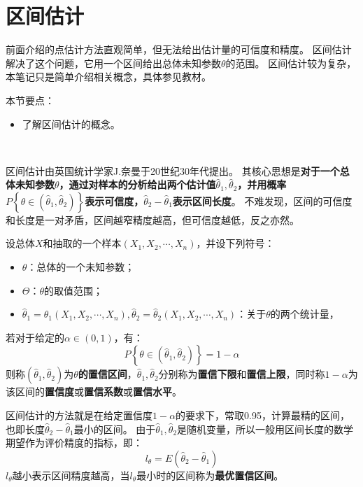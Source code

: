 \section{区间估计}

前面介绍的点估计方法直观简单，但无法给出估计量的可信度和精度。
区间估计解决了这个问题，它用一个区间给出总体未知参数$\theta $的范围。
区间估计较为复杂，本笔记只是简单介绍相关概念，具体参见教材。

本节要点：
\begin{itemize}
    \item 了解区间估计的概念。
\end{itemize}

~

区间估计由英国统计学家J.奈曼于20世纪30年代提出。
其核心思想是{\bf 对于一个总体未知参数$\theta $，通过对样本的分析给出两个估计值$\hat{\theta}_1,\hat{\theta}_2$，并用概率$P\left\{ \theta \in \left( \hat{\theta}_1,\hat{\theta}_2 \right) \right\} $表示可信度，$\hat{\theta}_2-\hat{\theta}_1$表示区间长度}。
不难发现，区间的可信度和长度是一对矛盾，区间越窄精度越高，但可信度越低，反之亦然。

\begin{definition}[区间估计]
设总体$X$和抽取的一个样本$\left( X_1,X_2,\cdots ,X_n \right) $，并设下列符号：
\begin{itemize}
    \item $\theta $：总体的一个未知参数；
    \item $\varTheta $：$\theta $的取值范围；
    \item $\hat{\theta}_1=\hat{\theta}_1\left( X_1,X_2,\cdots ,X_n \right) ,\hat{\theta}_2=\hat{\theta}_2\left( X_1,X_2,\cdots ,X_n \right) $：关于$\theta $的两个统计量，
\end{itemize}
若对于给定的$\alpha \in \left( 0,1 \right) $，有：
\[
P\left\{ \theta \in \left( \hat{\theta}_1,\hat{\theta}_2 \right) \right\} =1-\alpha
\]
则称$\left( \hat{\theta}_1,\hat{\theta}_2 \right) $为{\bf $\theta $的置信区间}，$\hat{\theta}_1,\hat{\theta}_2$分别称为{\bf 置信下限}和{\bf 置信上限}，同时称$1-\alpha$为该区间的{\bf 置信度}或{\bf 置信系数}或{\bf 置信水平}。
\end{definition}

区间估计的方法就是在给定置信度$1-\alpha$的要求下，常取0.95，计算最精的区间，也即长度$\hat{\theta}_2-\hat{\theta}_1$最小的区间。
由于$\hat{\theta}_1,\hat{\theta}_2$是随机变量，所以一般用区间长度的数学期望作为评价精度的指标，即：
\[
l_{\theta}=E\left( \hat{\theta}_2-\hat{\theta}_1 \right)
\]
$l_{\theta}$越小表示区间精度越高，当$l_{\theta}$最小时的区间称为{\bf 最优置信区间}。

